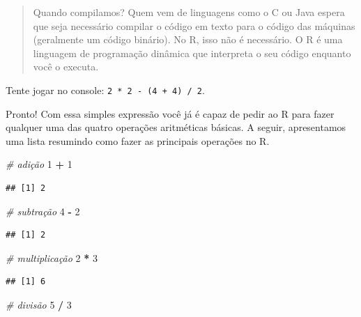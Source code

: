 \documentclass[
]{book}
\newenvironment{Shaded}{\begin{snugshade}}{\end{snugshade}}
\newcommand{\CommentTok}[1]{\textcolor[rgb]{0.56,0.35,0.01}{\textit{#1}}}
\newcommand{\DecValTok}[1]{\textcolor[rgb]{0.00,0.00,0.81}{#1}}
\newcommand{\OperatorTok}[1]{\textcolor[rgb]{0.81,0.36,0.00}{\textbf{#1}}}
\newcommand{\StringTok}[1]{\textcolor[rgb]{0.31,0.60,0.02}{#1}}
\begin{document}
\begin{quote}
Quando compilamos? Quem vem de linguagens como o C ou Java espera que seja necessário compilar o código em texto para o código das máquinas (geralmente um código binário). No R, isso não é necessário. O R é uma linguagem de programação dinâmica que interpreta o seu código enquanto você o executa.
\end{quote}

Tente jogar no console: \texttt{2\ *\ 2\ -\ (4\ +\ 4)\ /\ 2}.

Pronto! Com essa simples expressão você já é capaz de pedir ao R para fazer qualquer uma das quatro operações aritméticas básicas. A seguir, apresentamos uma lista resumindo como fazer as principais operações no R.

\begin{Shaded}
\begin{Highlighting}[]
\CommentTok{\# adição}
\DecValTok{1} \OperatorTok{+}\StringTok{ }\DecValTok{1}
\end{Highlighting}
\end{Shaded}

\begin{verbatim}
## [1] 2
\end{verbatim}

\begin{Shaded}
\begin{Highlighting}[]
\CommentTok{\# subtração}
\DecValTok{4} \OperatorTok{{-}}\StringTok{ }\DecValTok{2}
\end{Highlighting}
\end{Shaded}

\begin{verbatim}
## [1] 2
\end{verbatim}

\begin{Shaded}
\begin{Highlighting}[]
\CommentTok{\# multiplicação}
\DecValTok{2} \OperatorTok{*}\StringTok{ }\DecValTok{3}
\end{Highlighting}
\end{Shaded}

\begin{verbatim}
## [1] 6
\end{verbatim}

\begin{Shaded}
\begin{Highlighting}[]
\CommentTok{\# divisão}
\DecValTok{5} \OperatorTok{/}\StringTok{ }\DecValTok{3}
\end{Highlighting}
\end{Shaded}
\end{document}
